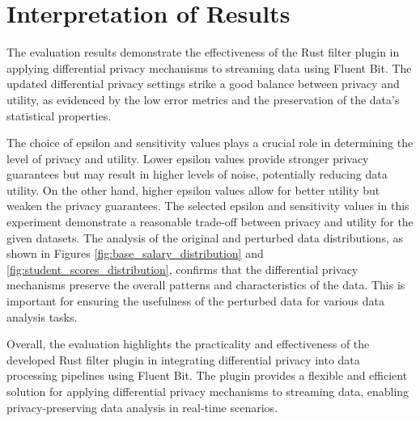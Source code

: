 \section{Interpretation of Results}

The evaluation results demonstrate the effectiveness of the Rust filter plugin in applying differential privacy mechanisms to streaming data using Fluent Bit. The updated differential privacy settings strike a good balance between privacy and utility, as evidenced by the low error metrics and the preservation of the data's statistical properties.

The choice of epsilon and sensitivity values plays a crucial role in determining the level of privacy and utility. Lower epsilon values provide stronger privacy guarantees but may result in higher levels of noise, potentially reducing data utility. On the other hand, higher epsilon values allow for better utility but weaken the privacy guarantees. The selected epsilon and sensitivity values in this experiment demonstrate a reasonable trade-off between privacy and utility for the given datasets.
The analysis of the original and perturbed data distributions, as shown in Figures \ref{fig:base_salary_distribution} and \ref{fig:student_scores_distribution}, confirms that the differential privacy mechanisms preserve the overall patterns and characteristics of the data. This is important for ensuring the usefulness of the perturbed data for various data analysis tasks.

Overall, the evaluation highlights the practicality and effectiveness of the developed Rust filter plugin in integrating differential privacy into data processing pipelines using Fluent Bit. The plugin provides a flexible and efficient solution for applying differential privacy mechanisms to streaming data, enabling privacy-preserving data analysis in real-time scenarios.